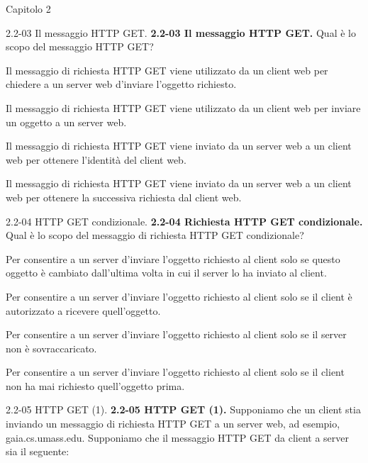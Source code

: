\documentclass[11pt]{article}
\begin{document}
\begin{quiz}{Capitolo 2}
\begin{multi}[points=1,shuffle]{2.2-03 Il messaggio HTTP GET.}
\textbf{2.2-03 Il messaggio HTTP GET.} Qual è lo scopo del messaggio HTTP GET?
\item* Il messaggio di richiesta HTTP GET viene utilizzato da un client web per chiedere a un server web d'inviare l'oggetto richiesto.
\item Il messaggio di richiesta HTTP GET viene utilizzato da un client web per inviare un oggetto a un server web.
\item Il messaggio di richiesta HTTP GET viene inviato da un server web a un client web per ottenere l'identità del client web.
\item Il messaggio di richiesta HTTP GET viene inviato da un server web a un client web per ottenere la successiva richiesta dal client web.
\end{multi}


\begin{multi}[points=1,shuffle]{2.2-04 HTTP GET condizionale.}
\textbf{2.2-04 Richiesta HTTP GET condizionale.} Qual è lo scopo del messaggio di richiesta HTTP GET condizionale?
\item* Per consentire a un server d'inviare l'oggetto richiesto al client solo se questo oggetto è cambiato dall'ultima volta in cui il server lo ha inviato al client.
\item Per consentire a un server d'inviare l'oggetto richiesto al client solo se il client è autorizzato a ricevere quell'oggetto.
\item Per consentire a un server d'inviare l'oggetto richiesto al client solo se il server non è sovraccaricato.
\item Per consentire a un server d'inviare l'oggetto richiesto al client solo se il client non ha mai richiesto quell'oggetto prima.
\end{multi}

\begin{multi}[points=1,shuffle]{2.2-05 HTTP GET (1).}
\textbf{2.2-05 HTTP GET (1).} 
Supponiamo che un client stia inviando un messaggio di richiesta HTTP GET a un server web, ad esempio, gaia.cs.umass.edu. Supponiamo che il messaggio HTTP GET da client a server sia il seguente:\\

\\


\end{multi}
\end{quiz}
\end{document}
